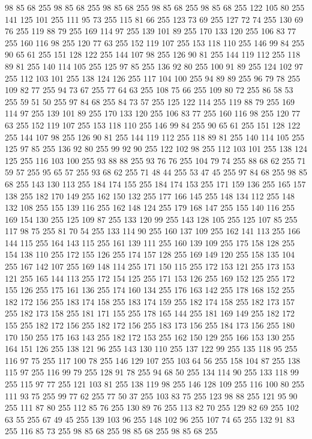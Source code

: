 98 85 68 255 98 85 68 255 98 85 68 255 98 85 68 255 98 85 68 255 122 105 80 255 141 125 101 255 111 95 73 255 115 81 66 255 123 73 69 255 127 72 74 255 130 69 76 255 119 88 79 255 169 114 97 255 139 101 89 255 170 133 120 255 106 83 77 255 160 116 98 255 120 77 63 255 152 119 107 255 153 118 110 255 146 99 84 255 90 65 61 255 151 128 122 255 144 107 98 255 126 90 81 255 144 119 112 255 118 89 81 255 140 114 105 255 125 97 85 255 136 92 80 255 100 91 89 255 124 102 97 255 112 103 101 255 138 124 126 255 117 104 100 255 94 89 89 255 96 79 78 255 109 82 77 255 94 73 67 255 77 64 63 255 108 75 66 255 109 80 72 255 86 58 53 255 59 51 50 255 97 84 68 255 84 73 57 255 125 122 114 255 119 88 79 255 169 114 97 255 139 101 89 255 170 133 120 255 106 83 77 255 160 116 98 255 120 77 63 255 152 119 107 255 153 118 110 255 146 99 84 255 90 65 61 255 151 128 122 255 144 107 98 255 126 90 81 255 144 119 112 255 118 89 81 255
140 114 105 255 125 97 85 255 136 92 80 255 99 92 90 255 122 102 98 255 112 103 101 255 138 124 125 255 116 103 100 255 93 88 88 255 93 76 76 255 104 79 74 255 88 68 62 255 71 59 57 255 95 65 57 255 93 68 62 255 71 48 44 255 53 47 45 255 97 84 68 255 98 85 68 255 143 130 113 255 184 174 155 255 184 174 153 255 171 159 136 255 165 157 138 255 182 170 149 255 162 150 132 255 177 166 145 255 148 134 112 255 148 132 108 255 155 139 116 255 162 148 124 255 179 168 147 255 155 140 116 255 169 154 130 255 125 109 87 255 133 120 99 255 143 128 105 255 125 107 85 255 117 98 75 255 81 70 54 255 133 114 90 255 160 137 109 255 162 141 113 255 166 144 115 255 164 143 115 255 161 139 111 255 160 139 109 255 175 158 128 255 154 138 110 255 172 155 126 255 174 157 128 255 169 149 120 255 158 135 104 255 167 142 107 255 169 148 114 255 171 150 115 255 172 153 121 255 173 153 121 255 165 144 113 255 172 154 125 255 171 153 126 255 169 152 125 255 172 155 126 255 175 161 136 255
174 160 134 255 176 163 142 255 178 168 152 255 182 172 156 255 183 174 158 255 183 174 159 255 182 174 158 255 182 173 157 255 182 173 158 255 181 171 155 255 178 165 144 255 181 169 149 255 182 172 155 255 182 172 156 255 182 172 156 255 183 173 156 255 184 173 156 255 180 170 150 255 175 163 143 255 182 172 153 255 162 150 129 255 166 153 130 255 164 151 126 255 138 121 96 255 143 130 110 255 137 122 99 255 135 118 95 255 116 97 75 255 117 100 78 255 146 129 107 255 103 64 56 255 158 104 87 255 138 115 97 255 116 99 79 255 128 91 78 255 94 68 50 255 134 114 90 255 133 118 99 255 115 97 77 255 121 103 81 255 138 119 98 255 146 128 109 255 116 100 80 255 111 93 75 255 99 77 62 255 77 50 37 255 103 83 75 255 123 98 88 255 121 95 90 255 111 87 80 255 112 85 76 255 130 89 76 255 113 82 70 255 129 82 69 255 102 63 55 255 67 49 45 255 139 103 96 255 148 102 96 255 107 74 65 255 132 91 83 255 116 85 73 255 98 85 68 255 98 85 68 255 98 85 68 255
